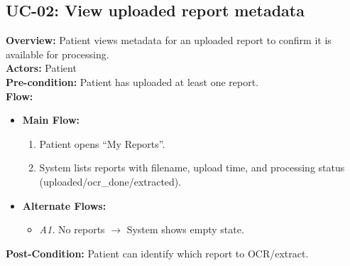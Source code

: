 \documentclass[12pt, a4paper]{article}
\begin{document}
\subsection*{UC-02: View uploaded report metadata}
\textbf{Overview:} Patient views metadata for an uploaded report to confirm it is available for processing. \\
\textbf{Actors:} Patient \\
\textbf{Pre-condition:} Patient has uploaded at least one report. \\
\textbf{Flow:}
\begin{itemize}[leftmargin=*]
    \item \textbf{Main Flow:}
    \begin{enumerate}
        \item Patient opens “My Reports”.
        \item System lists reports with filename, upload time, and processing status (uploaded/ocr\_done/extracted).
    \end{enumerate}
    \item \textbf{Alternate Flows:}
    \begin{itemize}
        \item \textit{A1.} No reports $\rightarrow$ System shows empty state.
    \end{itemize}
\end{itemize}
\textbf{Post-Condition:} Patient can identify which report to OCR/extract.
\end{document}
